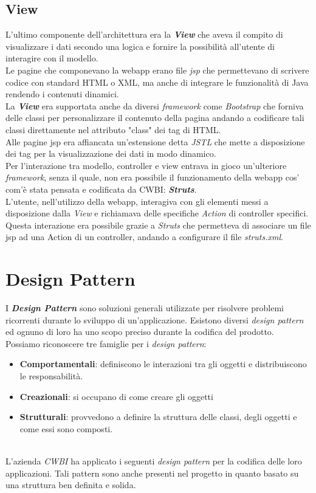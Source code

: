 \subsection*{View}
L'ultimo componente dell'architettura era la \textit{\textbf{View}} che aveva il compito di visualizzare i dati secondo una logica e fornire la possibilità all'utente di interagire con il modello.
\\
\noindent
Le pagine che componevano la webapp erano file \textit{jsp} che permettevano di scrivere codice con standard HTML o XML, ma anche di integrare le funzionalità di Java rendendo i contenuti dinamici. \\
\newpage
\noindent
La \textbf{\textit{View}} era supportata anche da diversi \textit{framework} come \textit{Bootstrap} che forniva delle classi per personalizzare il contenuto della pagina andando a codificare tali classi direttamente nel attributo "class" dei tag di HTML. \\
Alle pagine jsp era affiancata un'estensione detta \textit{JSTL} che mette a disposizione dei tag per la visualizzazione dei dati in modo dinamico.
\\
\noindent
Per l'interazione tra modello, controller e view entrava in gioco un'ulteriore \textit{framework}, senza il quale, non era possibile il funzionamento della webapp cos' com'è stata pensata e codificata da CWBI: \textit{\textbf{Struts}}.\\

\noindent
L'utente, nell'utilizzo della webapp, interagiva con gli elementi messi a disposizione dalla \textit{View} e richiamava delle specifiche \textit{Action} di controller specifici. Questa interazione era possibile grazie a \textit{Struts} che permetteva di associare un file jsp ad una Action di un controller, andando a configurare il file \textit{struts.xml}.

\section{Design Pattern}
I \textbf{\textit{Design Pattern}} sono soluzioni generali utilizzate per risolvere problemi ricorrenti durante lo sviluppo di un'applicazione. Esistono diversi \textit{design pattern} ed ognuno di loro ha uno scopo preciso durante la codifica del prodotto. \\
Possiamo riconoscere tre famiglie per i \textit{design pattern}:\\
\begin{itemize}
\item \textbf{Comportamentali}: definiscono le interazioni tra gli oggetti e distribuiscono le responsabilità.
\item \textbf{Creazionali}: si occupano di come creare gli oggetti
\item \textbf{Strutturali}: provvedono a definire la struttura delle classi, degli oggetti e come essi sono composti.
\end{itemize} 
\\
\noindent
L'azienda \textit{CWBI} ha applicato i seguenti \textit{design pattern} per la codifica delle loro applicazioni. Tali pattern sono anche presenti nel progetto in quanto basato su una struttura ben definita e solida.

